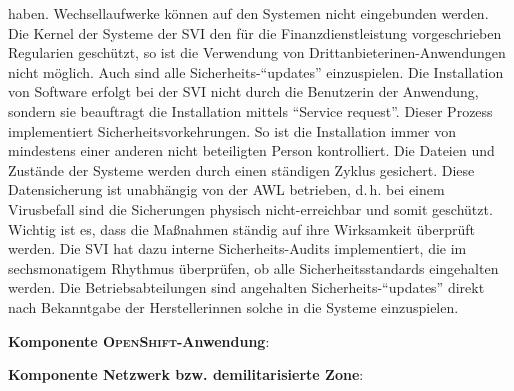 haben. Wechsellaufwerke können auf den Systemen nicht eingebunden werden. Die Kernel der Systeme der \ac{SVI} den für die Finanzdienstleistung vorgeschrieben Regularien geschützt, so ist die Verwendung von Drittanbieterinen-Anwendungen nicht möglich. Auch sind alle Sicherheits-\enquote{updates} einzuspielen. Die Installation von Software erfolgt bei der \ac{SVI} nicht durch die Benutzerin der Anwendung, sondern sie beauftragt die Installation mittels \enquote{Service request}. Dieser Prozess implementiert Sicherheitsvorkehrungen. So ist die Installation immer von mindestens einer anderen nicht beteiligten Person kontrolliert. Die Dateien und Zustände der Systeme werden durch einen ständigen Zyklus gesichert. Diese Datensicherung ist unabhängig von der \ac{AWL} betrieben, d.\,h. bei einem Virusbefall sind die Sicherungen physisch nicht-erreichbar und somit geschützt. Wichtig ist es, dass die Maßnahmen ständig auf ihre Wirksamkeit überprüft werden. Die \ac{SVI} hat dazu interne Sicherheits-Audits implementiert, die im sechsmonatigem Rhythmus überprüfen, ob alle Sicherheitsstandards eingehalten werden. Die Betriebsabteilungen sind angehalten Sicherheits-\enquote{updates} direkt nach Bekanntgabe der Herstellerinnen solche in die Systeme einzuspielen.
\par
\textbf{Komponente \textsc{OpenShift}-Anwendung}:
\par
\par
\textbf{Komponente Netzwerk bzw. demilitarisierte Zone}:
\par
